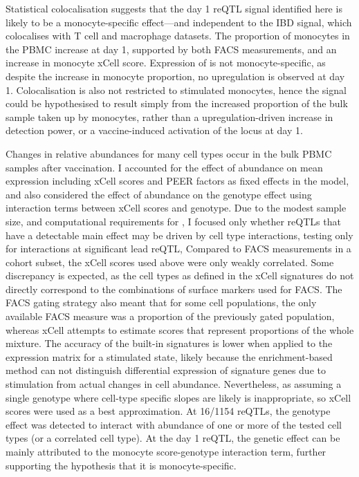 Statistical colocalisation suggests that the day 1 reQTL signal identified here is likely to be a monocyte-specific effect---and independent to the IBD signal, which colocalises with T cell and macrophage datasets.
The proportion of monocytes in the PBMC increase at day 1, supported by both FACS\autocite{sobolev2016AdjuvantedInfluenzaH1N1Vaccination} measurements, and an increase in monocyte xCell score.
Expression of  is not monocyte-specific, as despite the increase in monocyte proportion, no upregulation is observed at day 1.
Colocalisation is also not restricted to stimulated monocytes,
hence the signal could be hypothesised to result simply from the increased proportion of the bulk sample taken up by monocytes,
rather than a upregulation-driven increase in detection power,
or a vaccine-induced activation of the locus at day 1.

Changes in relative abundances for many cell types occur in the bulk PBMC samples after vaccination.
I accounted for the effect of abundance on mean expression including xCell scores and PEER factors as fixed effects in the model,
and also considered the effect of abundance on the genotype effect using interaction terms between xCell scores and genotype.
Due to the modest sample size, and computational requirements for , 
I focused only whether reQTLs that have a detectable main effect may be driven by cell type interactions,
testing only for interactions at significant lead \gls{reQTL},
%
Compared to FACS measurements in a cohort subset, the xCell scores used above were only weakly correlated.
Some discrepancy is expected, as the cell types as defined in the xCell signatures do not directly correspond to the combinations of surface markers used for FACS.
The FACS gating strategy also meant that for some cell populations, the only available FACS measure was a proportion of the previously gated population,
whereas xCell attempts to estimate scores that represent proportions of the whole mixture.
The accuracy of the built-in signatures is lower when applied to the expression matrix for a stimulated state,
likely because the enrichment-based method can not distinguish differential expression of signature genes due to stimulation from actual changes in cell abundance.
Nevertheless, as assuming a single genotype where cell-type specific slopes are likely is inappropriate, so xCell scores were used as a best approximation.
%
At 16/1154 reQTLs, the genotype effect was detected to interact with abundance of one or more of the tested cell types (or a correlated cell type).
At the day 1  reQTL, the genetic effect can be mainly attributed to the monocyte score-genotype interaction term, further supporting the hypothesis that it is monocyte-specific.

